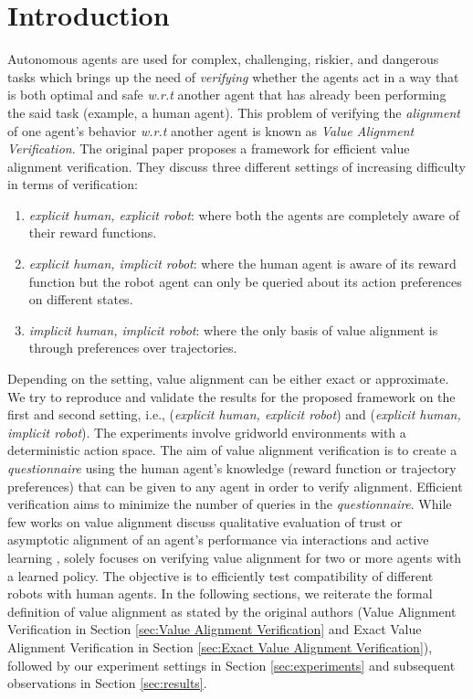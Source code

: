 \section{Introduction}
Autonomous agents are used for complex, challenging, riskier, and dangerous tasks which brings up the need of \textit{verifying} whether the agents act in a way that is both optimal and safe \textit{w.r.t} another agent that has already been performing the said task (example, a human agent). This problem of verifying the \textit{alignment} of one agent's behavior \textit{w.r.t} another agent is known as \textit{Value Alignment Verification}. The original paper \cite{brown2021value} proposes a framework for efficient value alignment verification. They discuss three different settings of increasing difficulty in terms of verification:
\begin{enumerate}
    \item \textit{explicit human, explicit robot}: where both the agents are completely aware of their reward functions.
    \item \textit{explicit human, implicit robot}: where the human agent is aware of its reward function but the robot agent can only be queried about its action preferences on different states.
    \item \textit{implicit human, implicit robot}: where the only basis of value alignment is through preferences over trajectories.
\end{enumerate}
Depending on the setting, value alignment can be either exact or approximate. We try to reproduce and validate the results for the proposed framework on the first and second setting, i.e., (\textit{explicit human, explicit robot}) and (\textit{explicit human, implicit robot}). The experiments involve gridworld environments with a deterministic action space. The aim of value alignment verification is to create a \textit{questionnaire} using the human agent's knowledge (reward function or trajectory preferences) that can be given to any agent in order to verify alignment. Efficient verification aims to minimize the number of queries in the \textit{questionnaire}. While few works on value alignment discuss qualitative evaluation of trust \cite{huang2018establishing} or asymptotic alignment of an agent’s performance via interactions and active learning \cite{hadfield2016cooperative} \cite{christiano2017deep} \cite{sadigh2017active}, \cite{brown2021value} solely focuses on verifying value alignment for two or more agents with a learned policy. The objective is to efficiently test compatibility of different robots with human agents. In the following sections, we reiterate the formal definition of value alignment as stated by the original authors (Value Alignment Verification in Section \ref{sec:Value Alignment Verification} and Exact Value Alignment Verification in Section \ref{sec:Exact Value Alignment Verification}), followed by our experiment settings in Section \ref{sec:experiments} and subsequent observations in Section \ref{sec:results}.
